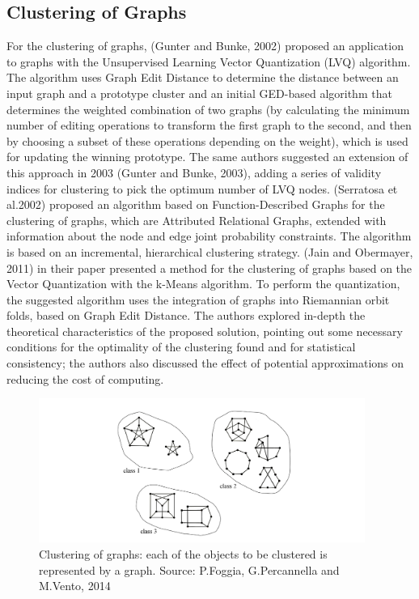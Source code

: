 \subsection{Clustering of Graphs}
For the clustering of graphs, (Gunter and Bunke, 2002) proposed an application to graphs with the Unsupervised Learning Vector Quantization (LVQ) algorithm. The algorithm uses Graph Edit Distance to determine the distance between an input graph and a prototype cluster and an initial GED-based algorithm that determines the weighted combination of two graphs (by calculating the minimum number of editing operations to transform the first graph to the second, and then by choosing a subset of these operations depending on the weight), which is used for updating the winning prototype. The same authors suggested an extension of this approach in 2003 (Gunter and Bunke, 2003), adding a series of validity indices for clustering to pick the optimum number of LVQ nodes. (Serratosa et al.2002) proposed an algorithm based on Function-Described Graphs for the clustering of graphs, which are Attributed Relational Graphs, extended with information about the node and edge joint probability constraints. The algorithm is based on an incremental, hierarchical clustering strategy. (Jain and Obermayer, 2011) in their paper presented a method for the clustering of graphs based on the Vector Quantization with the k-Means algorithm. To perform the quantization, the suggested algorithm uses the integration of graphs into Riemannian orbit folds, based on Graph Edit Distance. The authors explored in-depth the theoretical characteristics of the proposed solution, pointing out some necessary conditions for the optimality of the clustering found and for statistical consistency; the authors also discussed the effect of potential approximations on reducing the cost of computing.

\begin{figure}[h]
\centering
\includegraphics[width=0.95\textwidth,center]{picture/figure6.png}
\caption[Miniaturtrichter]{Clustering of graphs: each of the objects to be clustered is represented by a graph. Source: P.Foggia, G.Percannella and M.Vento, 2014}
\label{fig:clusteringgraphs}
\end{figure}


